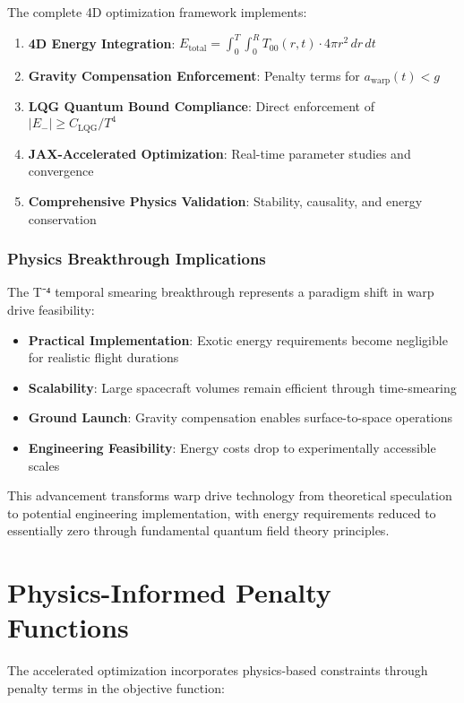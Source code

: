 \documentclass[12pt,a4paper]{article}
\begin{document}
The complete 4D optimization framework implements:

\begin{enumerate}
\item \textbf{4D Energy Integration}: $E_{\text{total}} = \int_0^T \int_0^R T_{00}(r,t) \cdot 4\pi r^2 \, dr \, dt$
\item \textbf{Gravity Compensation Enforcement}: Penalty terms for $a_{\text{warp}}(t) < g$
\item \textbf{LQG Quantum Bound Compliance}: Direct enforcement of $|E_-| \geq C_{\text{LQG}}/T^4$
\item \textbf{JAX-Accelerated Optimization}: Real-time parameter studies and convergence
\item \textbf{Comprehensive Physics Validation}: Stability, causality, and energy conservation
\end{enumerate}

\subsubsection{Physics Breakthrough Implications}

The T⁻⁴ temporal smearing breakthrough represents a paradigm shift in warp drive feasibility:

\begin{itemize}
\item \textbf{Practical Implementation}: Exotic energy requirements become negligible for realistic flight durations
\item \textbf{Scalability}: Large spacecraft volumes remain efficient through time-smearing
\item \textbf{Ground Launch}: Gravity compensation enables surface-to-space operations
\item \textbf{Engineering Feasibility}: Energy costs drop to experimentally accessible scales
\end{itemize}

This advancement transforms warp drive technology from theoretical speculation to potential engineering implementation, with energy requirements reduced to essentially zero through fundamental quantum field theory principles.

\section{Physics-Informed Penalty Functions}

The accelerated optimization incorporates physics-based constraints through penalty terms in the objective function:
\end{document}
